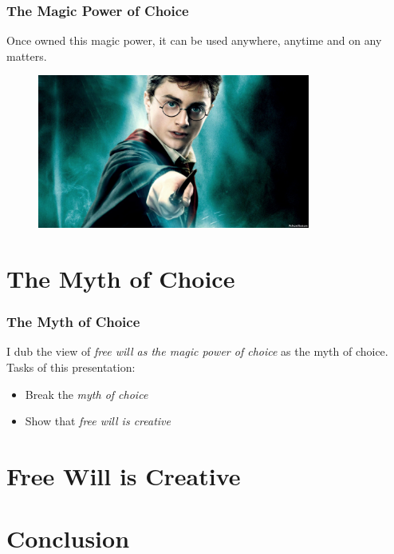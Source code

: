 \documentclass[xcolor=dvipsnames]{beamer}
\theoremstyle{definition}
\begin{document}
\begin{frame}[fragile]
  \frametitle{The Magic Power of Choice}
  Once owned this magic power, it can be used \alert{anywhere}, \alert{anytime} and on \alert{any matters}.
  \begin{figure}
    \centering
    \includegraphics[width=0.8\textwidth]{images/magic.jpg}\\
  \end{figure}
\end{frame}


\section{The Myth of Choice} %
\label{sec:myth}

\begin{frame}[fragile]
  \frametitle{The Myth of Choice}
  I dub the view of \emph{free will as the magic power of choice} as the \alert{myth of choice}.\\[1cm]

  Tasks of this presentation:
  \begin{itemize}
  \item Break the \emph{myth of choice}
  \item Show that \emph{free will is creative}
  \end{itemize}
\end{frame}


\section{Free Will is Creative} %
\label{sec:creative}

\section{Conclusion} %
\label{sec:conclusion}
\end{document}
